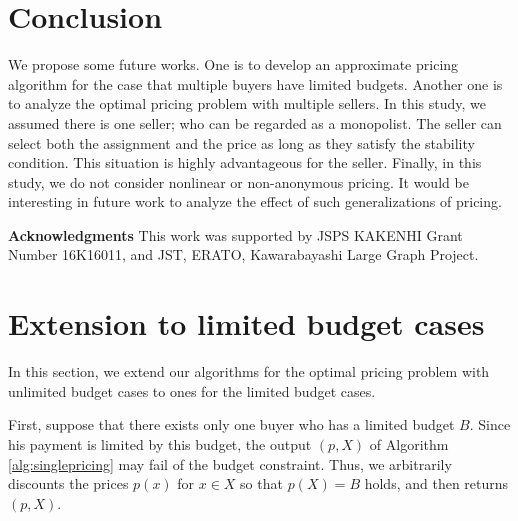 \documentclass[letterpaper]{article}
\newcommand{\OMIT}[1]{}
\theoremstyle{definition}
\begin{document}
\section{Conclusion}
\label{sec:conclusion}

We propose some future works.
One is to develop an approximate pricing algorithm for the case that multiple buyers have limited budgets.
Another one is to analyze the optimal pricing problem with multiple sellers.
In this study, we assumed there is one seller; who can be regarded as a monopolist.
The seller can select both the assignment and the price as long as they satisfy the stability condition.
This situation is highly advantageous for the seller.
Finally, in this study, we do not consider nonlinear or non-anonymous pricing.
It would be interesting in future work to analyze the effect of such generalizations of pricing.

\medskip

\noindent \textbf{Acknowledgments} This work was supported by JSPS KAKENHI Grant Number 16K16011, and JST, ERATO, Kawarabayashi Large Graph Project.





\clearpage

\appendix

\section{Extension to limited budget cases}

In this section, we extend our algorithms for the optimal pricing problem with unlimited budget cases to ones for the limited budget cases. 


First, suppose that there exists only one buyer who has a limited budget $B$. 
Since his payment is limited by this budget, the output $(p, X)$ of Algorithm \ref{alg:singlepricing} may fail of the budget constraint. 
Thus, we arbitrarily discounts the prices $p(x)$ for $x \in X$ so that $p(X) = B$ holds, and then returns $(p, X)$. 

\OMIT{
\begin{algorithm}[tb]
\caption{Pricing algorithm for a single buyer with a budget constraint.}
\begin{algorithmic}
  \FOR{$s = 1, 2, \ldots, |V|$}
  \STATE{Let $X^s$ be the largest $s$ elements of $f(x)$}
  \STATE{Price $p^s(x) = f(X^s) - f(X^s \setminus x)$ for all $x \in X^s$ and $p^s(y) = +\infty$ for all $y \in V \setminus X^s$}
  \ENDFOR
  \STATE{Select $p$ and $X$ that attains maximum of $p^s(X^s)$}
  \IF{$p(X) > B$}
  \STATE{Discount $p(x)$ \ ($x \in X$) arbitrary to $p(X) = B$}
  \ENDIF
  \STATE{\textbf{Return $p$ and $X$}}
\end{algorithmic}
\end{algorithm}
}
\end{document}
